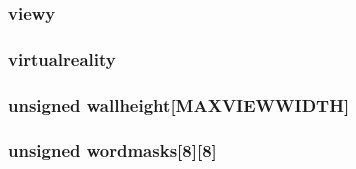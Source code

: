\label{WL__DEF_8H_afb516c78f435a37fab0a0a7b975ff4d9}
\hypertarget{WL__DEF_8H_a0ebb891d97bc41244012d2b8d7458f22}{
\subsubsection[{viewy}]{ {\bf viewy}}}
\label{WL__DEF_8H_a0ebb891d97bc41244012d2b8d7458f22}
\hypertarget{WL__DEF_8H_a19f0beeaba2b97e5c1c18467d930de1c}{
\subsubsection[{virtualreality}]{ {\bf virtualreality}}}
\label{WL__DEF_8H_a19f0beeaba2b97e5c1c18467d930de1c}
\hypertarget{WL__DEF_8H_a9bae25635a51ae6d6ed9884e6cb79559}{
\subsubsection[{wallheight}]{\setlength{\rightskip}{0pt plus 5cm}unsigned {\bf wallheight}\mbox{[}MAXVIEWWIDTH\mbox{]}}}
\label{WL__DEF_8H_a9bae25635a51ae6d6ed9884e6cb79559}
\hypertarget{WL__DEF_8H_a1c8053b1c5185cc1701015d26ca61eb0}{
\subsubsection[{wordmasks}]{\setlength{\rightskip}{0pt plus 5cm}unsigned {\bf wordmasks}\mbox{[}8\mbox{]}\mbox{[}8\mbox{]}}}
\label{WL__DEF_8H_a1c8053b1c5185cc1701015d26ca61eb0}
